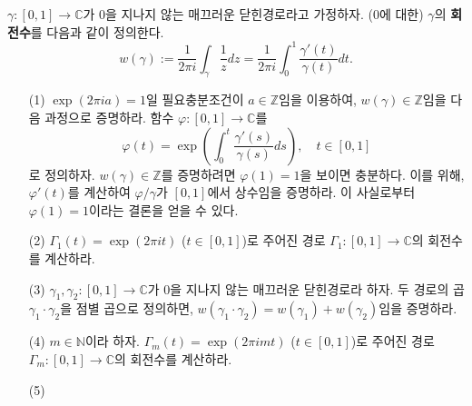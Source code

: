 \begin{salt_exercise} \label{ex-3-21}
$\gamma:[0,1]\to\mathbb C$가 $0$을 지나지 않는
매끄러운 닫힌경로라고 가정하자. ($0$에 대한) $\gamma$의 {\bf 회전수}를 
다음과 같이 정의한다.
\[
w(\gamma) := \dfrac1{2\pi i}\int_\gamma \dfrac 1z dz
= \dfrac1{2\pi i}\int_0^1 \dfrac{\gamma'(t)}{\gamma(t)}dt.
\]
\begin{itemize}
\item[(1)] $\exp(2\pi ia)=1$일 필요충분조건이 $a\in\mathbb Z$임을 이용하여,
$w(\gamma)\in\mathbb Z$임을 다음 과정으로 증명하라.
함수 $\varphi:[0,1] \to\mathbb C$를 
\[
\varphi(t) = \exp\left( \int_0^t \dfrac{\gamma'(s)}{\gamma(s)}ds\right),
\quad t\in[0,1]
\]
로 정의하자.  $w(\gamma)\in\mathbb Z$를 증명하려면
$\varphi(1)=1$을 보이면 충분하다.
이를 위해, $\varphi'(t)$를 계산하여 $\varphi/\gamma$가 $[0,1]$에서 상수임을 증명하라.
이 사실로부터 $\varphi(1)=1$이라는 결론을 얻을 수 있다.
\item[(2)] $\Gamma_1(t)=\exp(2\pi it)$ ($t\in[0,1]$)로 주어진 경로 $\Gamma_1:[0,1]\to\mathbb C$의
회전수를 계산하라.
\item[(3)] $\gamma_1, \gamma_2:[0,1]\to\mathbb C$가 $0$을 지나지 않는
매끄러운 닫힌경로라 하자. 두 경로의 곱 $\gamma_1\cdot\gamma_2$을
점별 곱으로 정의하면, $w(\gamma_1\cdot\gamma_2) = w(\gamma_1)+w(\gamma_2)$임을
증명하라.
\item[(4)] $m\in \mathbb N$이라 하자. 
$\Gamma_m(t)=\exp(2\pi imt)$ ($t\in[0,1]$)로 주어진 경로 $\Gamma_m:[0,1]\to\mathbb C$의
회전수를 계산하라.
\item[(5)] 
\end{itemize}
\end{salt_exercise}













